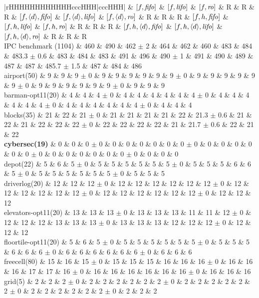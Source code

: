 \begin{center}
\begin{tabular}{|rHHHHHHHHHHHHcccHHH|cccHHH|}
\hline
 & $[f,{\text{\textit{fifo}}}]$ & $[f,{\text{\textit{lifo}}}]$ & $[f,{\text{\textit{ro}}}]$ & R & R & R & $[f,{\left<d\right>},{\text{\textit{fifo}}}]$ & $[f,{\left<d\right>},{\text{\textit{lifo}}}]$ & $[f,{\left<d\right>},{\text{\textit{ro}}}]$ & R & R & R & $[f,h,{\text{\textit{fifo}}}]$ & $[f,h,{\text{\textit{lifo}}}]$ & $[f,h,{\text{\textit{ro}}}]$ & R & R & R & $[f,h,{\left<d\right>},{\text{\textit{fifo}}}]$ & $[f,h,{\left<d\right>},{\text{\textit{lifo}}}]$ & $[f,h,{\left<d\right>},{\text{\textit{ro}}}]$ & R & R & R\\
\hline
IPC benchmark (1104) & 460 & 490 & 462 $\pm$ 2 & 464 & 462 & 460 & 483 & 484 & 483.3 $\pm$ 0.6 & 483 & 484 & 483 & 491 & 496 & 490 $\pm$ 1 & 491 & 490 & 489 & 487 & 487 & 485.7 $\pm$ 1.5 & 487 & 484 & 486\\
\hline
airport(50) & 9 & 9 & 9 $\pm$ 0 & 9 & 9 & 9 & 9 & 9 & 9 $\pm$ 0 & 9 & 9 & 9 & 9 & 9 & 9 $\pm$ 0 & 9 & 9 & 9 & 9 & 9 & 9 $\pm$ 0 & 9 & 9 & 9\\
barman-opt11(20) & 4 & 4 & 4 $\pm$ 0 & 4 & 4 & 4 & 4 & 4 & 4 $\pm$ 0 & 4 & 4 & 4 & 4 & 4 & 4 $\pm$ 0 & 4 & 4 & 4 & 4 & 4 & 4 $\pm$ 0 & 4 & 4 & 4\\
blocks(35) & 21 & 22 & 21 $\pm$ 0 & 21 & 21 & 21 & 21 & 22 & 21.3 $\pm$ 0.6 & 21 & 22 & 21 & 22 & 22 & 22 $\pm$ 0 & 22 & 22 & 22 & 22 & 21 & 21.7 $\pm$ 0.6 & 22 & 21 & 22\\
\textbf{cybersec(19)} & 0 & 0 & 0 $\pm$ 0 & 0 & 0 & 0 & 0 & 0 & 0 $\pm$ 0 & 0 & 0 & 0 & 0 & 0 & 0 $\pm$ 0 & 0 & 0 & 0 & 0 & 0 & 0 $\pm$ 0 & 0 & 0 & 0\\
depot(22) & 5 & 6 & 5 $\pm$ 0 & 5 & 5 & 5 & 5 & 5 & 5 $\pm$ 0 & 5 & 5 & 5 & 6 & 6 & 5 $\pm$ 0 & 5 & 5 & 5 & 5 & 5 & 5 $\pm$ 0 & 5 & 5 & 5\\
driverlog(20) & 12 & 12 & 12 $\pm$ 0 & 12 & 12 & 12 & 12 & 12 & 12 $\pm$ 0 & 12 & 12 & 12 & 12 & 12 & 12 $\pm$ 0 & 12 & 12 & 12 & 12 & 12 & 12 $\pm$ 0 & 12 & 12 & 12\\
elevators-opt11(20) & 13 & 13 & 13 $\pm$ 0 & 13 & 13 & 13 & 11 & 11 & 12 $\pm$ 0 & 12 & 12 & 12 & 13 & 13 & 13 $\pm$ 0 & 13 & 13 & 13 & 12 & 12 & 12 $\pm$ 0 & 12 & 12 & 12\\
floortile-opt11(20) & 5 & 6 & 5 $\pm$ 0 & 5 & 5 & 5 & 5 & 5 & 5 $\pm$ 0 & 5 & 5 & 5 & 6 & 6 & 6 $\pm$ 0 & 6 & 6 & 6 & 6 & 6 & 6 $\pm$ 0 & 6 & 6 & 6\\
freecell(80) & 15 & 16 & 15 $\pm$ 0 & 15 & 15 & 15 & 16 & 16 & 16 $\pm$ 0 & 16 & 16 & 16 & 17 & 17 & 16 $\pm$ 0 & 16 & 16 & 16 & 16 & 16 & 16 $\pm$ 0 & 16 & 16 & 16\\
grid(5) & 2 & 2 & 2 $\pm$ 0 & 2 & 2 & 2 & 2 & 2 & 2 $\pm$ 0 & 2 & 2 & 2 & 2 & 2 & 2 $\pm$ 0 & 2 & 2 & 2 & 2 & 2 & 2 $\pm$ 0 & 2 & 2 & 2\\

\end{tabular}
\end{center}

